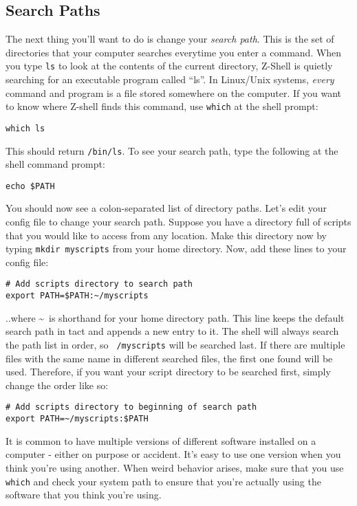 \documentclass[12pt, letterpaper]{article}
\begin{document}
\subsection{Search Paths}
\label{sec:path}
The next thing you'll want to do is change your \emph{search path}.  This is
the set of directories that your computer searches everytime you enter a
command.  When you type {\tt ls} to look at the contents of the current
directory, Z-Shell is quietly searching for an executable program called ``ls''.
In Linux/Unix systems, \emph{every} command and program is a file stored
somewhere on the computer.
If you want to know where Z-shell finds this command, use {\tt which} at the
shell prompt:
\begin{verbatim}
which ls
\end{verbatim}
This should return {\tt /bin/ls}.  To see your search path, type the following
at the shell command prompt:
\begin{verbatim}
echo $PATH
\end{verbatim}
You should now see a colon-separated list of directory paths.  Let's edit
your config file to change your search path.  Suppose you have a directory
full of scripts that you would like to access from any location.  Make this
directory now by typing {\tt mkdir myscripts} from your home directory.
Now, add these lines to your config file:
\begin{verbatim}
# Add scripts directory to search path
export PATH=$PATH:~/myscripts
\end{verbatim}
..where \textasciitilde \  is shorthand for your home directory path.  This line
keeps the default search path in tact and appends a new entry to it.  The
shell will always search the path list in order, so {\tt ~/myscripts} will be
searched last.  If there are multiple files with the same name in different
searched files, the first one found will be used.  Therefore, if you want
your script directory to be searched first, simply change the order like so:
\begin{verbatim}
# Add scripts directory to beginning of search path
export PATH=~/myscripts:$PATH
\end{verbatim}

\begin{tcolorbox}[title=\textbf{Confusing Paths}]
  It is common to have multiple versions of different software installed
  on a computer - either on purpose or accident. It's easy to use one
  version when you think you're using another. When weird behavior arises,
  make sure that you use {\tt which} and check your system path to ensure
  that you're actually using the software that you think you're using.
\end{tcolorbox}
\end{document}
